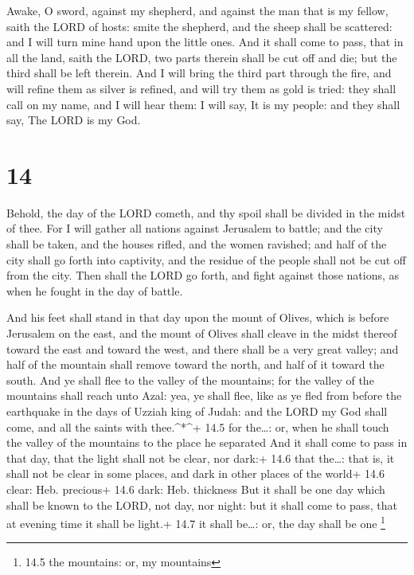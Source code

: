  Awake, O sword, against my shepherd, and against the man
that is my fellow, saith the LORD of hosts: smite the shepherd, and the
sheep shall be scattered: and I will turn mine hand upon the little
ones.  And it shall come to pass, that in all the land,
saith the LORD, two parts therein shall be cut off and die; but the
third shall be left therein.  And I will bring the third
part through the fire, and will refine them as silver is refined, and
will try them as gold is tried: they shall call on my name, and I will
hear them: I will say, It is my people: and they shall say, The LORD is
my God.

\hypertarget{section-13}{%
\section{14}\label{section-13}}

 Behold, the day of the LORD cometh, and thy spoil shall be
divided in the midst of thee.  For I will gather all nations
against Jerusalem to battle; and the city shall be taken, and the houses
rifled, and the women ravished; and half of the city shall go forth into
captivity, and the residue of the people shall not be cut off from the
city.  Then shall the LORD go forth, and fight against those
nations, as when he fought in the day of battle.

 And his feet shall stand in that day upon the mount of
Olives, which is before Jerusalem on the east, and the mount of Olives
shall cleave in the midst thereof toward the east and toward the west,
and there shall be a very great valley; and half of the mountain shall
remove toward the north, and half of it toward the south. 
And ye shall flee to the valley of the mountains; for the valley of the
mountains shall reach unto Azal: yea, ye shall flee, like as ye fled
from before the earthquake in the days of Uzziah king of Judah: and the
LORD my God shall come, and all the saints with thee.\^{}*\^{}+ 14.5 for
the\ldots: or, when he shall touch the valley of the mountains to the
place he separated  And it shall come to pass in that day,
that the light shall not be clear, nor dark:+ 14.6 that the\ldots: that
is, it shall not be clear in some places, and dark in other places of
the world+ 14.6 clear: Heb. precious+ 14.6 dark: Heb. thickness
 But it shall be one day which shall be known to the LORD,
not day, nor night: but it shall come to pass, that at evening time it
shall be light.+ 14.7 it shall be\ldots: or, the day shall be one
\footnote{14.5 the mountains: or, my mountains}

